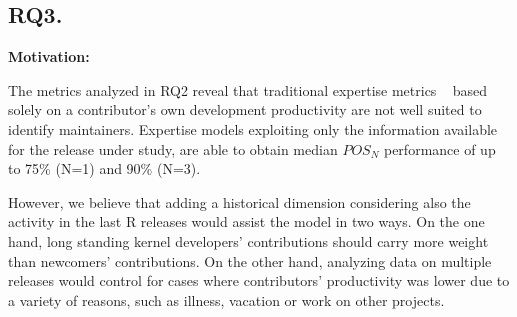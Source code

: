 


\subsection*{RQ3. \rqthree}
\label{sec:rq3.-does-historical}

{\bf Motivation:} 

The metrics analyzed in RQ2 reveal that traditional expertise metrics
~\cite{McDonald,1572315,mockus02} based solely on a contributor's own development productivity are not well suited to identify maintainers. Expertise models exploiting only the information available for the release under study, are able to obtain median $POS_N$ performance of up to 75\% (N=1) and 90\% (N=3).%

However, %
we believe that adding a historical dimension considering also the activity in the last R releases would assist the model in two ways. On the one hand, long standing kernel developers' contributions should carry more weight than newcomers' contributions. On the other hand, analyzing data on multiple releases would control for cases where contributors' productivity was lower due to a variety of reasons, such as illness, vacation or work on other projects.





